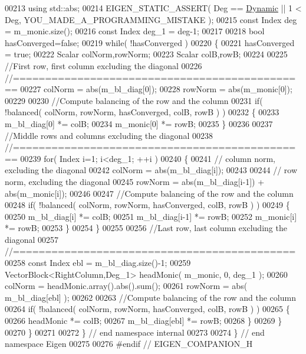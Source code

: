 \begin{DoxyCode}
00213   \textcolor{keyword}{using} std::abs;
00214   EIGEN\_STATIC\_ASSERT( Deg == \hyperlink{namespace_eigen_ad81fa7195215a0ce30017dfac309f0b2}{Dynamic} || 1 < Deg, YOU\_MADE\_A\_PROGRAMMING\_MISTAKE );
00215   \textcolor{keyword}{const} Index deg   = m\_monic.size();
00216   \textcolor{keyword}{const} Index deg\_1 = deg-1;
00217 
00218   \textcolor{keywordtype}{bool} hasConverged=\textcolor{keyword}{false};
00219   \textcolor{keywordflow}{while}( !hasConverged )
00220   \{
00221     hasConverged = \textcolor{keyword}{true};
00222     Scalar colNorm,rowNorm;
00223     Scalar colB,rowB;
00224 
00225     \textcolor{comment}{//First row, first column excluding the diagonal}
00226     \textcolor{comment}{//==============================================}
00227     colNorm = abs(m\_bl\_diag[0]);
00228     rowNorm = abs(m\_monic[0]);
00229 
00230     \textcolor{comment}{//Compute balancing of the row and the column}
00231     \textcolor{keywordflow}{if}( !balanced( colNorm, rowNorm, hasConverged, colB, rowB ) )
00232     \{
00233       m\_bl\_diag[0] *= colB;
00234       m\_monic[0] *= rowB;
00235     \}
00236 
00237     \textcolor{comment}{//Middle rows and columns excluding the diagonal}
00238     \textcolor{comment}{//==============================================}
00239     \textcolor{keywordflow}{for}( Index i=1; i<deg\_1; ++i )
00240     \{
00241       \textcolor{comment}{// column norm, excluding the diagonal}
00242       colNorm = abs(m\_bl\_diag[i]);
00243 
00244       \textcolor{comment}{// row norm, excluding the diagonal}
00245       rowNorm = abs(m\_bl\_diag[i-1]) + abs(m\_monic[i]);
00246 
00247       \textcolor{comment}{//Compute balancing of the row and the column}
00248       \textcolor{keywordflow}{if}( !balanced( colNorm, rowNorm, hasConverged, colB, rowB ) )
00249       \{
00250         m\_bl\_diag[i]   *= colB;
00251         m\_bl\_diag[i-1] *= rowB;
00252         m\_monic[i]     *= rowB;
00253       \}
00254     \}
00255 
00256     \textcolor{comment}{//Last row, last column excluding the diagonal}
00257     \textcolor{comment}{//============================================}
00258     \textcolor{keyword}{const} Index ebl = m\_bl\_diag.size()-1;
00259     VectorBlock<RightColumn,Deg\_1> headMonic( m\_monic, 0, deg\_1 );
00260     colNorm = headMonic.array().abs().sum();
00261     rowNorm = abs( m\_bl\_diag[ebl] );
00262 
00263     \textcolor{comment}{//Compute balancing of the row and the column}
00264     \textcolor{keywordflow}{if}( !balanced( colNorm, rowNorm, hasConverged, colB, rowB ) )
00265     \{
00266       headMonic      *= colB;
00267       m\_bl\_diag[ebl] *= rowB;
00268     \}
00269   \}
00270 \}
00271 
00272 \} \textcolor{comment}{// end namespace internal}
00273 
00274 \} \textcolor{comment}{// end namespace Eigen}
00275 
00276 \textcolor{preprocessor}{#endif // EIGEN\_COMPANION\_H}
\end{DoxyCode}
